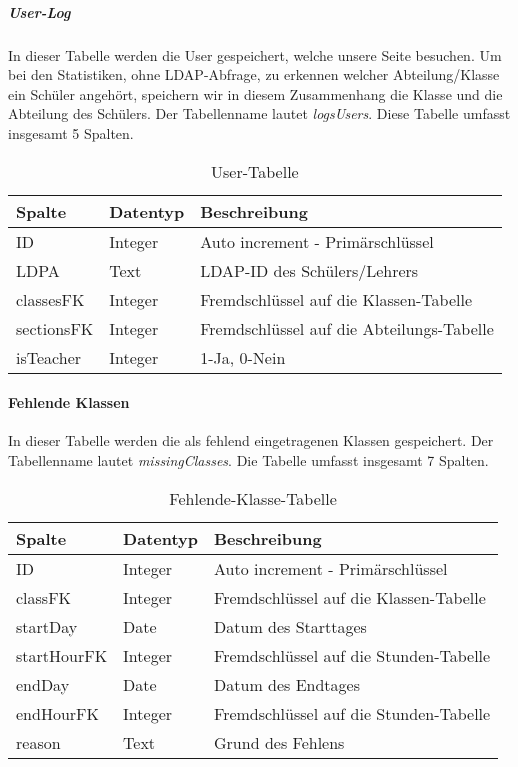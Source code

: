 \subparagraph{User-Log\\}
In dieser Tabelle werden die User gespeichert, welche unsere Seite besuchen. Um bei den Statistiken, ohne LDAP-Abfrage, zu erkennen welcher Abteilung/Klasse ein Schüler angehört, speichern wir in diesem Zusammenhang die Klasse und die Abteilung des Schülers. Der Tabellenname lautet \textit{logsUsers}. Diese Tabelle umfasst insgesamt 5 Spalten. 

\begin{table}[H]
\centering
\begin{tabular}{p{2.5 cm}p{2.5 cm}p{10 cm}}
   \toprule
   \textbf{Spalte} & \textbf{Datentyp} & \textbf{Beschreibung} \\
   \midrule
          ID & Integer & Auto increment - Primärschlüssel  \\
          \hline
          LDPA & Text & LDAP-ID des Schülers/Lehrers   \\
          \hline
	      classesFK & Integer & Fremdschlüssel auf die Klassen-Tabelle   \\
	      \hline
          sectionsFK & Integer & Fremdschlüssel auf die Abteilungs-Tabelle   \\
          \hline
          isTeacher & Integer & 1-Ja, 0-Nein  \\
   \bottomrule
\end{tabular}
\caption{User-Tabelle}
\end{table}

\paragraph{Fehlende Klassen\\}
In dieser Tabelle werden die als fehlend eingetragenen Klassen gespeichert. Der Tabellenname lautet \textit{missingClasses}. Die Tabelle umfasst insgesamt 7 Spalten.

\begin{table}[H]
\centering
\begin{tabular}{p{2.5 cm}p{2.5 cm}p{10 cm}}
   \toprule
   \textbf{Spalte} & \textbf{Datentyp} & \textbf{Beschreibung} \\
   \midrule
          ID & Integer & Auto increment - Primärschlüssel  \\
          \hline
          classFK & Integer & Fremdschlüssel auf die Klassen-Tabelle   \\
          \hline
	      startDay & Date & Datum des Starttages   \\
	      \hline
          startHourFK & Integer & Fremdschlüssel auf die Stunden-Tabelle   \\
          \hline
          endDay & Date & Datum des Endtages   \\
          \hline
          endHourFK & Integer & Fremdschlüssel auf die Stunden-Tabelle   \\
          \hline
          reason & Text & Grund des Fehlens  \\
   \bottomrule
\end{tabular}
\caption{Fehlende-Klasse-Tabelle}
\end{table}

